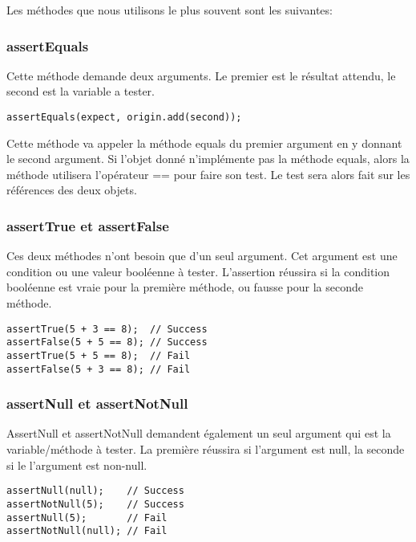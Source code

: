\documentclass[12pt]{article}		%
\begin{document}
Les méthodes que nous utilisons le plus souvent sont les suivantes:

\subsubsection{assertEquals}

Cette méthode demande deux arguments. Le premier est le résultat attendu, le second est la variable a tester.

\lstset{language=Java, numbers=left}
\begin{lstlisting}
assertEquals(expect, origin.add(second));
\end{lstlisting}

Cette méthode va appeler la méthode equals du premier argument en y donnant le second argument. Si l'objet donné n'implémente pas la méthode equals, alors la méthode utilisera l'opérateur == pour faire son test. Le test sera alors fait sur les références des deux objets.

\subsubsection{assertTrue et assertFalse}

Ces deux méthodes n'ont besoin que d'un seul argument. Cet argument est une condition ou une valeur booléenne à tester. L'assertion réussira si la condition booléenne est vraie pour la première méthode, ou fausse  pour la seconde méthode.

\lstset{language=Java, numbers=left}
\begin{lstlisting}
assertTrue(5 + 3 == 8);  // Success
assertFalse(5 + 5 == 8); // Success
assertTrue(5 + 5 == 8);  // Fail
assertFalse(5 + 3 == 8); // Fail
\end{lstlisting}

\subsubsection{assertNull et assertNotNull}

AssertNull et assertNotNull demandent également un seul argument qui est la variable/méthode à tester. La première réussira si l'argument est null, la seconde si le l'argument est non-null.

\lstset{language=Java, numbers=left}
\begin{lstlisting}
assertNull(null);    // Success
assertNotNull(5);    // Success
assertNull(5);       // Fail
assertNotNull(null); // Fail
\end{lstlisting}
\end{document}
